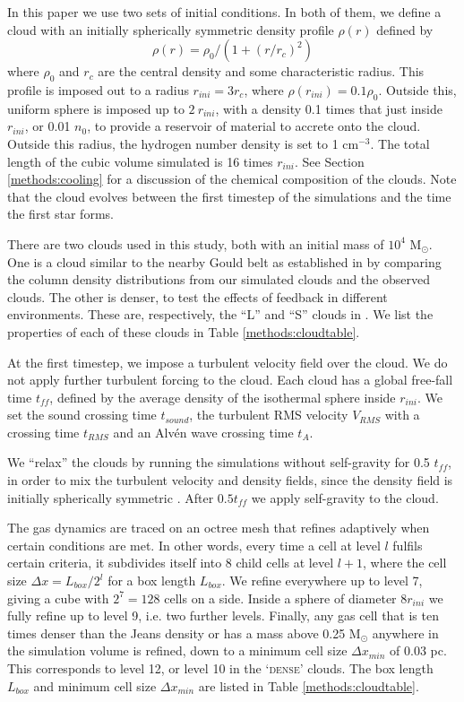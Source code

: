 \documentclass[a4paper,fleqn,usenatbib]{mnras}
\newcommand{\Msolar}{M$_{\odot}$\xspace}
\begin{document}
In this paper we use two sets of initial conditions. In both of them, we define a cloud with an initially spherically symmetric density profile $\rho(r)$ defined by
\begin{equation}
\rho(r) = \rho_0 / (1 + (r/r_c)^2)
\label{isothermal}
\end{equation}
where $\rho_0$ and $r_c$ are the central density and some characteristic radius. This profile is imposed out to a radius $r_{ini}=3 r_c$, where $\rho(r_{ini})=0.1 \rho_0$. Outside this, uniform sphere is imposed up to $2~r_{ini}$, with a density 0.1 times that just inside $r_{ini}$, or 0.01 $n_0$, to provide a reservoir of material to accrete onto the cloud. Outside this radius, the hydrogen number density is set to 1 cm$^{-3}$. The total length of the cubic volume simulated is 16 times $r_{ini}$. See Section \ref{methods:cooling} for a discussion of the chemical composition of the clouds. Note that the cloud evolves between the first timestep of the simulations and the time the first star forms.

There are two clouds used in this study, both with an initial mass of $10^4$ \Msolar. One is a cloud similar to the nearby Gould belt as established in \cite{Geen2017} by comparing the column density distributions from our simulated clouds and the observed clouds. The other is denser, to test the effects of feedback in different environments. These are, respectively, the ``L'' and ``S'' clouds in \cite{Geen2017}. We list the properties of each of these clouds in Table \ref{methods:cloudtable}.

At the first timestep, we impose a turbulent velocity field over the cloud. We do not apply further turbulent forcing to the cloud. Each cloud has a global free-fall time $t_{ff}$, defined by the average density of the isothermal sphere inside $r_{ini}$. We set the sound crossing time $t_{sound}$, the turbulent RMS velocity $V_{RMS}$ with a crossing time $t_{RMS}$ and an Alv\'en wave crossing time $t_{A}$.

We ``relax'' the clouds by running the simulations without self-gravity for 0.5 $t_{ff}$, in order to mix the turbulent velocity and density fields, since the density field is initially spherically symmetric \citep[see][amongst others]{Klessen2000,Lee2016a}. After $0.5 t_{ff}$ we apply self-gravity to the cloud.

The gas dynamics are traced on an octree mesh that refines adaptively when certain conditions are met. In other words, every time a cell at level $l$ fulfils certain criteria, it subdivides itself into 8 child cells at level $l+1$, where the cell size $\Delta x = L_{box} / 2^l$ for a box length $L_{box}$. We refine everywhere up to level 7, giving a cube with $2^7=128$ cells on a side. Inside a sphere of diameter $8 r_{ini}$ we fully refine up to level 9, i.e. two further levels. Finally, any gas cell that is ten times denser than the Jeans density or has a mass above 0.25 \Msolar anywhere in the simulation volume is refined, down to a minimum cell size $\Delta x_{min}$ of 0.03 pc. This corresponds to level 12, or level 10 in the `\textsc{dense}' clouds. The box length $L_{box}$ and minimum cell size $\Delta x_{min}$ are listed in Table \ref{methods:cloudtable}.
\end{document}
